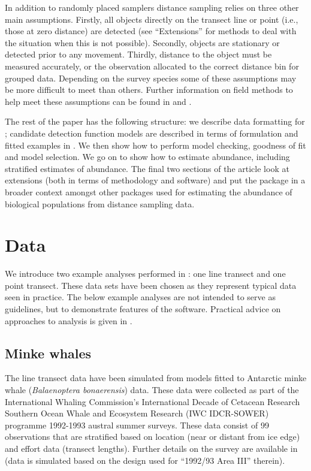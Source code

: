 \documentclass[article]{jss}
\begin{document}
In addition to randomly placed samplers distance sampling relies on three other main assumptions. Firstly, all objects directly on the transect line or point (i.e., those at zero distance) are detected (see ``Extensions'' for methods to deal with the situation when this is not possible). Secondly, objects are stationary or detected prior to any movement. Thirdly, distance to the object must be measured accurately, or the observation allocated to the correct distance bin for grouped data. Depending on the survey species some of these assumptions may be more difficult to meet than others. Further information on field methods to help meet these assumptions can be found in \cite{Buckland:2001vm} and \cite{buckland2015distance}.

The rest of the paper has the following structure: we describe data formatting for ; candidate detection function models are described in terms of formulation and fitted examples in . We then show how to perform model checking, goodness of fit and model selection. We go on to show how to estimate abundance, including stratified estimates of abundance. The final two sections of the article look at extensions (both in terms of methodology and software) and put the package in a broader context amongst other  packages used for estimating the abundance of biological populations from distance sampling data.

\section{Data}

We introduce two example analyses performed in : one line transect and one point transect. These data sets have been chosen as they represent typical data seen in practice. The below example analyses are not intended to serve as guidelines, but to demonstrate features of the software. Practical advice on approaches to analysis is given in \cite{Thomas:2010cf}.

\subsection{Minke whales}

The line transect data have been simulated from models fitted to Antarctic minke whale (\textit{Balaenoptera bonaerensis}) data. These data were collected as part of the International Whaling Commission's International Decade of Cetacean Research Southern Ocean Whale and Ecosystem Research (IWC IDCR-SOWER) programme 1992-1993 austral summer surveys. These data consist of 99 observations that are stratified based on location (near or distant from ice edge) and effort data (transect lengths). Further details on the survey are available in \cite{Branch:2001ua} (data is simulated based on the design used for ``1992/93 Area III'' therein).
\end{document}
